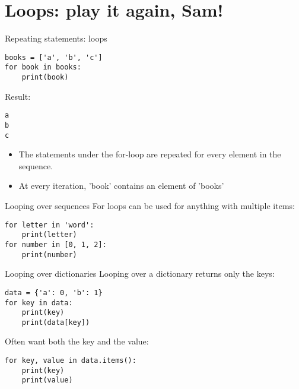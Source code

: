 \documentclass[aspectratio=169,usenames,dvipsnames]{beamer}
\begin{document}
\section{Loops: play it again, Sam!}
\begin{frame}[fragile]{Repeating statements: loops}
\begin{lstlisting}
books = ['a', 'b', 'c']
for book in books:
    print(book)
\end{lstlisting}
Result:
\begin{lstlisting}
a
b
c
\end{lstlisting}

\begin{itemize}
\item The statements under the for-loop are repeated
    for every element in the sequence.
\item At every iteration, 'book' contains an element of 'books'
\end{itemize}
\end{frame}

\begin{frame}[fragile]{Looping over sequences}
For loops can be used for anything with multiple items:
\begin{lstlisting}
for letter in 'word':
    print(letter)
for number in [0, 1, 2]:
    print(number)
\end{lstlisting}
\end{frame}

\begin{frame}[fragile]{Looping over dictionaries}
Looping over a dictionary returns only the keys:
\begin{lstlisting}
data = {'a': 0, 'b': 1}
for key in data:
    print(key)
    print(data[key])
\end{lstlisting}

\pause
Often want both the key and the value:
\begin{lstlisting}
for key, value in data.items():
    print(key)
    print(value)
\end{lstlisting}
\end{frame}
\end{document}
